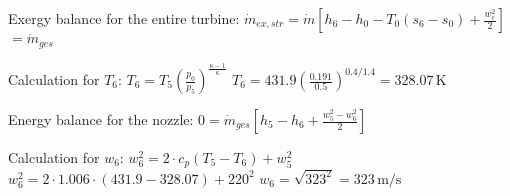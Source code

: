 Exergy balance for the entire turbine:  
\( \dot{m}_{ex,str} = \dot{m} \left[ h_6 - h_0 - T_0 (s_6 - s_0) + \frac{w_e^2}{2} \right] \)  
\( = \dot{m}_{ges} \)  

Calculation for \( T_6 \):  
\( T_6 = T_5 \left( \frac{p_0}{p_5} \right)^{\frac{\kappa - 1}{\kappa}} \)  
\( T_6 = 431.9 \left( \frac{0.191}{0.5} \right)^{0.4 / 1.4} = 328.07 \, \text{K} \)  

Energy balance for the nozzle:  
\( 0 = \dot{m}_{ges} \left[ h_5 - h_6 + \frac{w_5^2 - w_6^2}{2} \right] \)  

Calculation for \( w_6 \):  
\( w_6^2 = 2 \cdot c_p (T_5 - T_6) + w_5^2 \)  
\( w_6^2 = 2 \cdot 1.006 \cdot (431.9 - 328.07) + 220^2 \)  
\( w_6 = \sqrt{323^2} = 323 \, \text{m/s} \)
